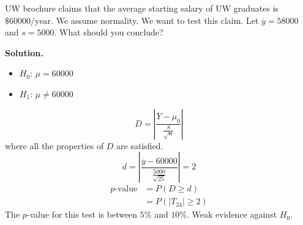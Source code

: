 \begin{exbox}
    \begin{example}
        UW brochure claims that the average starting salary of UW graduates
        is $ \$60000\text{/year} $. We assume normality. We want to test this claim.
        Let $ \overline{y}=58000 $ and $ s=5000 $. What should you conclude?

        \textbf{Solution.}
        \begin{itemize}
            \item $ H_0 $: $ \mu=60000 $
            \item $ H_1 $: $ \mu\neq 60000 $
        \end{itemize}
        \[ D=\left|\frac{\overline{Y}-\mu_0}{\frac{S}{\sqrt{n}}}\right| \]
        where all the properties of $ D $ are satisfied.
        \[ d=\left|\frac{\overline{y}-60000}{\frac{5000}{\sqrt{25}}}\right|=2 \]
        \begin{align*}
            p\text{-value}
             & =P(D\geqslant d)        \\
             & =P(|T_{24}|\geqslant 2)
        \end{align*}
        The $ p $-value for this test is between $ 5\% $ and $ 10\% $. Weak evidence
        against $ H_0 $.
    \end{example}
\end{exbox}
